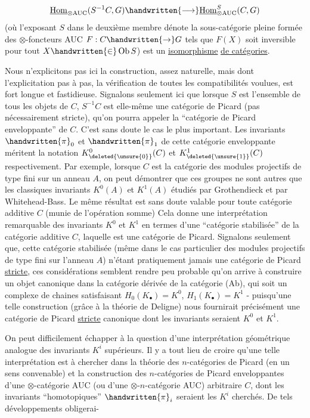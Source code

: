 
\[
\underline{\operatorname{Hom}}_{\otimes\mathrm{AUC}}(S^{-1}C,G)\handwritten{\longrightarrow}\underline{\operatorname{Hom}}^{S}_{\otimes\mathrm{AUC}}(C,G)
\]
(où l'exposant $S$ dans le deuxième membre dénote la sous-catégorie pleine formée des $\otimes$-foncteurs AUC $F:C\handwritten{\to}G$ tels que $F(X)$ soit inversible pour tout $X\handwritten{\in}\operatorname{Ob}S$) est un \uline{isomorphisme} \uline{de catégories}.

Nous n'explicitons pas ici la construction, assez naturelle, mais dont l'explicitation pas à pas,  la vérification de toutes les compatibilités voulues, est fort longue et fastidieuse. Signalons seulement ici que lorsque $S$ est l'ensemble de tous les objets de $C$, $S^{-1}C$ est elle-même une catégorie de Picard (pas nécessairement stricte), qu'on pourra appeler la ``catégorie de Picard enveloppante'' de $C$. C'est sans doute le cas le plus important. Les invariants $\handwritten{\pi}_0$ et $\handwritten{\pi}_1$ de cette catégorie enveloppante méritent la notation $K_{\deleted{\unsure{0}}}^{0}(C)$ et $K_{\deleted{\unsure{1}}}^{1}(C)$ respectivement. Par exemple, lorsque $C$ est la catégorie des modules projectifs de type fini sur un anneau $A$,  on peut démontrer que ces groupes ne sont autres que les classiques invariants $K^0(A)$ et $K^1(A)$ étudiés par Grothendieck et par Whitehead-Bass. Le même résultat est sans doute valable pour toute catégorie additive $C$ (munie de  l'opération somme) Cela donne une interprétation remarquable des invariants $K^0$ et $K^1$ en termes d'une ``catégorie stabilisée'' \handwritten{(}de la catégorie additive $C$\handwritten{)}, laquelle est une catégorie de Picard. Signalons seulement que, cette catégorie stabilisée (même dans le cas particulier des modules projectifs de type fini sur l'anneau $A$) n'étant pratiquement jamais une catégorie de Picard \uline{stricte}, ces considérations semblent rendre peu probable qu'on arrive à construire un objet canonique dans la catégorie dérivée de la catégorie (Ab), qui soit un complexe de chaines satisfaisant $H_0(K_\bullet)=K^0$, $H_1(K_\bullet)=K^1$ - puisqu'une telle construction (grâce à la théorie de Deligne) nous fournirait précisément une catégorie de Picard \uline{stricte} canonique dont les invariants seraient $K^0$ et $K^1$.

On peut difficilement échapper à la question d'une interprétation géométrique analogue des invariants $K^i$ supérieurs. Il y a tout lieu de croire qu'une telle interprétation est à chercher dans la théorie des $n$-catégories de Picard (en un sens convenable) et la construction des $n$-catégories de Picard enveloppantes d'une $\otimes$-catégorie AUC (ou d'une $\otimes$-$n$-catégorie AUC) arbitraire $C$, dont les invariants ``homotopiques'' $\handwritten{\pi}_i$ seraient les $K^i$ cherchés. De tels développements obligerai-


